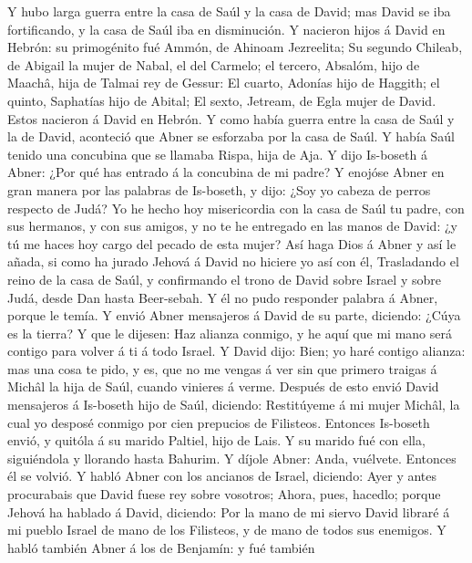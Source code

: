  Y hubo larga guerra entre la casa de Saúl y la casa de
David; mas David se iba fortificando, y la casa de Saúl iba en
disminución.  Y nacieron hijos á David en Hebrón: su
primogénito fué Ammón, de Ahinoam Jezreelita;  Su segundo
Chileab, de Abigail la mujer de Nabal, el del Carmelo; el tercero,
Absalóm, hijo de Maachâ, hija de Talmai rey de Gessur:  El
cuarto, Adonías hijo de Haggith; el quinto, Saphatías hijo de Abital;
 El sexto, Jetream, de Egla mujer de David. Estos nacieron á
David en Hebrón.  Y como había guerra entre la casa de Saúl
y la de David, aconteció que Abner se esforzaba por la casa de Saúl.
 Y había Saúl tenido una concubina que se llamaba Rispa,
hija de Aja. Y dijo Is-boseth á Abner: ¿Por qué has entrado á la
concubina de mi padre?  Y enojóse Abner en gran manera por
las palabras de Is-boseth, y dijo: ¿Soy yo cabeza de perros respecto de
Judá? Yo he hecho hoy misericordia con la casa de Saúl tu padre, con sus
hermanos, y con sus amigos, y no te he entregado en las manos de David:
¿y tú me haces hoy cargo del pecado de esta mujer?  Así haga
Dios á Abner y así le añada, si como ha jurado Jehová á David no hiciere
yo así con él,  Trasladando el reino de la casa de Saúl, y
confirmando el trono de David sobre Israel y sobre Judá, desde Dan hasta
Beer-sebah.  Y él no pudo responder palabra á Abner, porque
le temía.  Y envió Abner mensajeros á David de su parte,
diciendo: ¿Cúya es la tierra? Y que le dijesen: Haz alianza conmigo, y
he aquí que mi mano será contigo para volver á ti á todo Israel.
 Y David dijo: Bien; yo haré contigo alianza: mas una cosa
te pido, y es, que no me vengas á ver sin que primero traigas á Michâl
la hija de Saúl, cuando vinieres á verme.  Después de esto
envió David mensajeros á Is-boseth hijo de Saúl, diciendo: Restitúyeme á
mi mujer Michâl, la cual yo desposé conmigo por cien prepucios de
Filisteos.  Entonces Is-boseth envió, y quitóla á su marido
Paltiel, hijo de Lais.  Y su marido fué con ella,
siguiéndola y llorando hasta Bahurim. Y díjole Abner: Anda, vuélvete.
Entonces él se volvió.  Y habló Abner con los ancianos de
Israel, diciendo: Ayer y antes procurabais que David fuese rey sobre
vosotros;  Ahora, pues, hacedlo; porque Jehová ha hablado á
David, diciendo: Por la mano de mi siervo David libraré á mi pueblo
Israel de mano de los Filisteos, y de mano de todos sus enemigos.
 Y habló también Abner á los de Benjamín: y fué también
